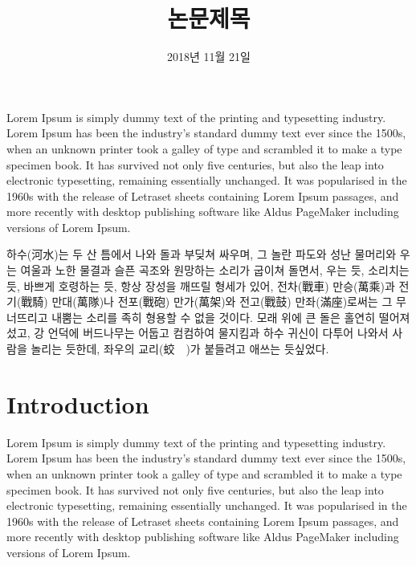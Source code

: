 \documentclass{thesis-SJ-two}
\title[English title]{논문제목}
\date{2018년 11월 21일}{November 21st, 2018}
\begin{document}
	\EnglishAbstract
	Lorem Ipsum is simply dummy text of the printing and typesetting industry. Lorem Ipsum has been the industry's standard dummy text ever since the 1500s, when an unknown printer took a galley of type and scrambled it to make a type specimen book. It has survived not only five centuries, but also the leap into electronic typesetting, remaining essentially unchanged. It was popularised in the 1960s with the release of Letraset sheets containing Lorem Ipsum passages, and more recently with desktop publishing software like Aldus PageMaker including versions of Lorem Ipsum.

	
	\KoreanAbstract
	하수(河水)는 두 산 틈에서 나와 돌과 부딪쳐 싸우며, 그 놀란 파도와 성난 물머리와 우는 여울과 노한 물결과 슬픈 곡조와 원망하는 소리가 굽이쳐 돌면서, 우는 듯, 소리치는 듯, 바쁘게 호령하는 듯, 항상 장성을 깨뜨릴 형세가 있어, 전차(戰車) 만승(萬乘)과 전기(戰騎) 만대(萬隊)나 전포(戰砲) 만가(萬架)와 전고(戰鼓) 만좌(滿座)로써는 그 무너뜨리고 내뿜는 소리를 족히 형용할 수 없을 것이다. 모래 위에 큰 돌은 홀연히 떨어져 섰고, 강 언덕에 버드나무는 어둡고 컴컴하여 물지킴과 하수 귀신이 다투어 나와서 사람을 놀리는 듯한데, 좌우의 교리(蛟　)가 붙들려고 애쓰는 듯싶었다.
	
	
	\tableofcontents
	
	\mainpartstart
	
	
	\chapter{Introduction} 
	
	Lorem Ipsum is simply dummy text of the printing and typesetting industry. Lorem Ipsum has been the industry's standard dummy text ever since the 1500s, when an unknown printer took a galley of type and scrambled it to make a type specimen book. It has survived not only five centuries, but also the leap into electronic typesetting, remaining essentially unchanged. It was popularised in the 1960s with the release of Letraset sheets containing Lorem Ipsum passages, and more recently with desktop publishing software like Aldus PageMaker including versions of Lorem Ipsum.
	
\end{document}
